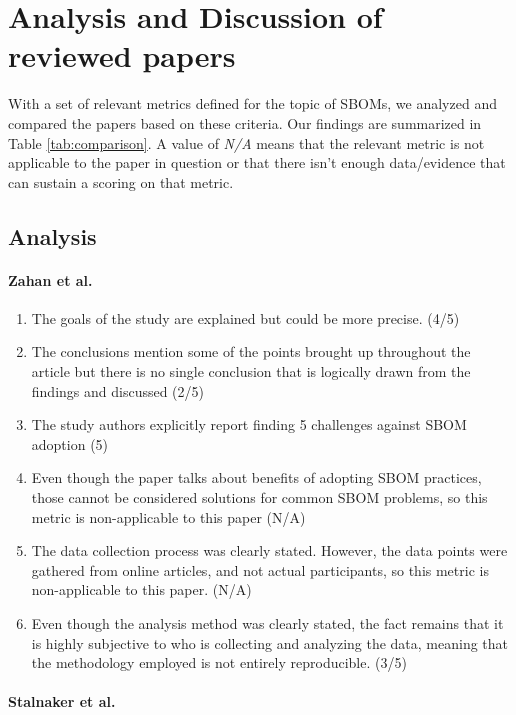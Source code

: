 \section{Analysis and Discussion of reviewed papers} \label{analysis}

\noindent With a set of relevant metrics defined for the topic of SBOMs, we analyzed and compared the papers based on these criteria. Our findings are summarized in Table \ref{tab:comparison}. A value of \emph{N/A} means that the relevant metric is not applicable to the paper in question or that there isn't enough data/evidence that can sustain a scoring on that metric.

\subsection{Analysis} \label{analysis}

\paragraph{Zahan et al. \cite{article:sbom-required}}

\begin{enumerate}
    \item The goals of the study are explained but could be more precise. (4/5)
    \item The conclusions mention some of the points brought up throughout the article but there is no single conclusion that is logically drawn from the findings and discussed (2/5)
    \item The study authors explicitly report finding 5 challenges against SBOM adoption (5)
    \item Even though the paper talks about benefits of adopting SBOM practices, those cannot be considered solutions for common SBOM problems, so this metric is non-applicable to this paper (N/A)
    \item The data collection process was clearly stated. However, the data points were gathered from online articles, and not actual participants, so this metric is non-applicable to this paper. (N/A)
    \item Even though the analysis method was clearly stated, the fact remains that it is highly subjective to who is collecting and analyzing the data, meaning that the methodology employed is not entirely reproducible. (3/5)
\end{enumerate}

\paragraph{Stalnaker et al. \cite{article:software-bom}}

